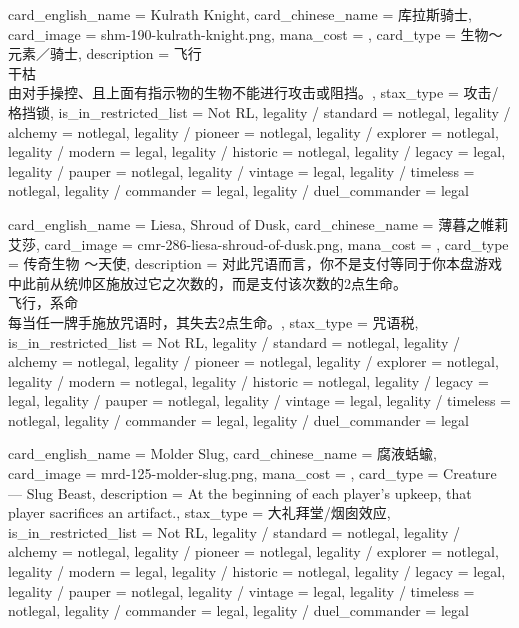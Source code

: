 \documentclass[lang = cn, color = black, 10pt]{AllThatStax}
\begin{document}
\card
{
	card_english_name = {Kulrath Knight},
	card_chinese_name = {库拉斯骑士},
	card_image = shm-190-kulrath-knight.png,
	mana_cost = ,
	card_type = 生物～元素／骑士,
	description = {飞行\\
		干枯 \\
		由对手操控、且上面有指示物的生物不能进行攻击或阻挡。},
	stax_type = 攻击/格挡锁,
	is_in_restricted_list = Not RL,
	legality / standard = notlegal,
	legality / alchemy = notlegal,
	legality / pioneer = notlegal,
	legality / explorer = notlegal,
	legality / modern = legal,
	legality / historic = notlegal,
	legality / legacy = legal,
	legality / pauper = notlegal,
	legality / vintage = legal,
	legality / timeless = notlegal,
	legality / commander = legal,
	legality / duel_commander = legal
}

\card
{
	card_english_name = {Liesa, Shroud of Dusk},
	card_chinese_name = {薄暮之帷莉艾莎},
	card_image = cmr-286-liesa-shroud-of-dusk.png,
	mana_cost = ,
	card_type = 传奇生物 ～天使,
	description = {对此咒语而言，你不是支付等同于你本盘游戏中此前从统帅区施放过它之次数的，而是支付该次数的2点生命。\\
		飞行，系命\\
		每当任一牌手施放咒语时，其失去2点生命。},
	stax_type = 咒语税,
	is_in_restricted_list = Not RL,
	legality / standard = notlegal,
	legality / alchemy = notlegal,
	legality / pioneer = notlegal,
	legality / explorer = notlegal,
	legality / modern = notlegal,
	legality / historic = notlegal,
	legality / legacy = legal,
	legality / pauper = notlegal,
	legality / vintage = legal,
	legality / timeless = notlegal,
	legality / commander = legal,
	legality / duel_commander = legal
}

\card
{
	card_english_name = {Molder Slug},
	card_chinese_name = {腐液蛞蝓},
	card_image = mrd-125-molder-slug.png,
	mana_cost = ,
	card_type = Creature — Slug Beast,
	description = {At the beginning of each player's upkeep, that player sacrifices an artifact.},
	stax_type = 大礼拜堂/烟囱效应,
	is_in_restricted_list = Not RL,
	legality / standard = notlegal,
	legality / alchemy = notlegal,
	legality / pioneer = notlegal,
	legality / explorer = notlegal,
	legality / modern = legal,
	legality / historic = notlegal,
	legality / legacy = legal,
	legality / pauper = notlegal,
	legality / vintage = legal,
	legality / timeless = notlegal,
	legality / commander = legal,
	legality / duel_commander = legal
}
\end{document}
